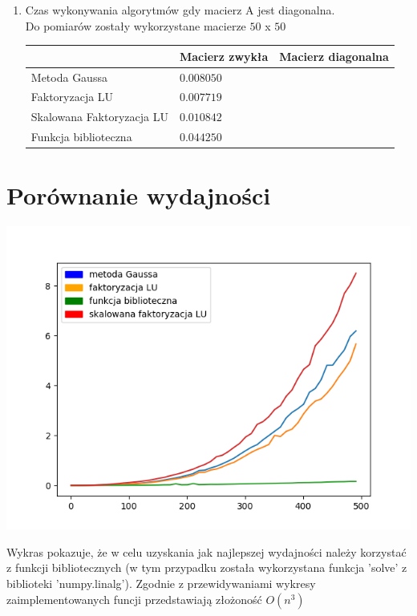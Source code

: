 \documentclass[11pt, a4paper]{article}
\begin{document}
\begin{enumerate}
\item Czas wykonywania algorytmów gdy macierz A jest diagonalna.\\
Do pomiarów zostały wykorzystane macierze \begin{math}50\end{math} x \begin{math}50\end{math}

\begin{center}
    \begin{tabular}{| l | l | l |}}
    \hline
    Metoda & Macierz zwykła & Macierz diagonalna\\ \hline
    Metoda Gaussa &  \begin{math}0.008050\end{math}\\ \hline
    Faktoryzacja LU & \begin{math}0.007719\end{math}\\ \hline
    Skalowana Faktoryzacja LU & \begin{math}0.010842\end{math}\\\hline
    Funkcja biblioteczna& \begin{math}0.044250\end{math}\\ \hline
    \end{tabular}
\end{center}

\end{enumerate}

\section{Porównanie wydajności}
\begin{center}
\includegraphics[scale=0.55]{Figure_3}
\end{center}
Wykras pokazuje, że w celu uzyskania jak najlepszej wydajności należy korzystać z funkcji bibliotecznych (w tym przypadku została wykorzystana funkcja 'solve' z biblioteki 'numpy.linalg'). Zgodnie z przewidywaniami wykresy zaimplementowanych funcji przedstawiają złożoność \begin{math} O(n^3) \end{math}

 
\end{document}
